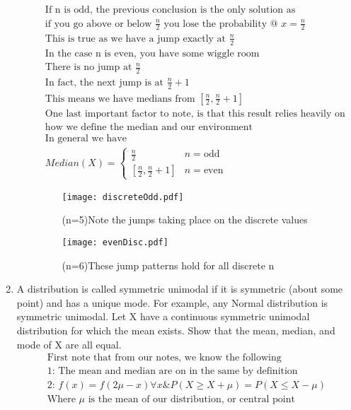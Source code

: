 \documentclass[11pt]{article}
\begin{document}
\begin{enumerate}
\begin{enumerate}
\begin{gather}
	\text{If n is odd, the previous conclusion is the only solution as }\\
	\text{if you go above or below } \frac{n}{2} \text{ you lose the probability @ } x = \frac{n}{2}\\
	\text{This is true as we have a jump exactly at }\frac{n}{2}\\
	\text{In the case n is even, you have some wiggle room}\\
	\text{There is no jump at }\frac{n}{2}\\
	\text{In fact, the next jump is at }\frac{n}{2}+1\\
	\text{This means we have medians from }[\frac{n}{2},\frac{n}{2}+1]\\
	\text{One last important factor to note, is that this result relies heavily on}\\
	\text{how we define the median and our environment}\\
	\text{In general we have}\\
	 Median(X) = 
	 \begin{cases}
	 \frac{n}{2} & n=\text{odd} \\
	 [\frac{n}{2},\frac{n}{2}+1] & n=\text{even}
	 \end{cases}
	\end{gather}
	\begin{figure}[H]
		\centering
		\caption{(n=5)Note the jumps taking place on the discrete values}
		\texttt{[image: discreteOdd.pdf]}
	\end{figure}
	\begin{figure}[H]
		\centering
		\caption{(n=6)These jump patterns hold for all discrete n}
		\texttt{[image: evenDisc.pdf]}
	\end{figure}
\end{enumerate}
\item A distribution is called symmetric unimodal if it is symmetric (about some point) and has a unique mode.
For example, any Normal distribution is symmetric unimodal. Let X have a continuous symmetric unimodal
distribution for which the mean exists. Show that the mean, median, and mode of X are all equal.
\begin{gather}
	\text{First note that from our notes, we know the following}\\
	\text{1: The mean and median are on in the same by definition}\\
	\text{2: }f(x)=f(2\mu - x)\forall x \& P(X \ge X+\mu) = P(X\le X-\mu)\\
	\text{Where $\mu$ is the mean of our distribution, or central point}\\

\end{gather}
\end{enumerate}
\end{document}
